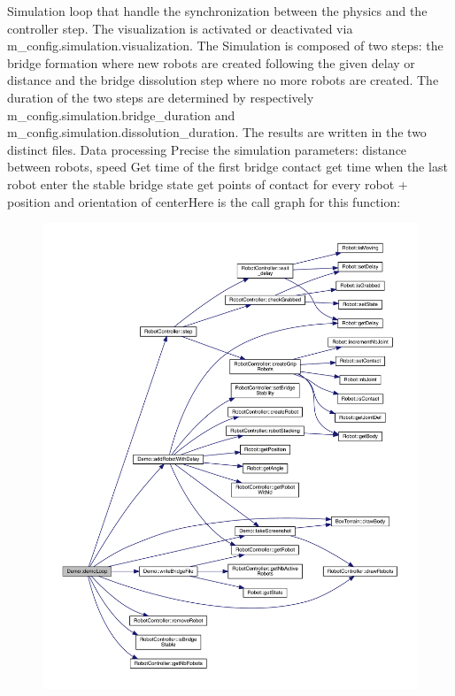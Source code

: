 Simulation loop that handle the synchronization between the physics and the controller step. The visualization is activated or deactivated via m\+\_\+config.\+simulation.\+visualization. The Simulation is composed of two steps\+: the bridge formation where new robots are created following the given delay or distance and the bridge dissolution step where no more robots are created. The duration of the two steps are determined by respectively m\+\_\+config.\+simulation.\+bridge\+\_\+duration and m\+\_\+config.\+simulation.\+dissolution\+\_\+duration. The results are written in the two distinct files. Data processing Precise the simulation parameters\+: distance between robots, speed Get time of the first bridge contact get time when the last robot enter the stable bridge state get points of contact for every robot + position and orientation of centerHere is the call graph for this function\+:\nopagebreak
\begin{figure}[H]
\begin{center}
\leavevmode
\includegraphics[width=350pt]{class_demo_a938c3b6ab1c98ce43f977dda9d4f2b3a_cgraph}
\end{center}
\end{figure}
\mbox{\label{class_demo_ac6657b0f7f55a81ba215811d31d9e5b5}} 

